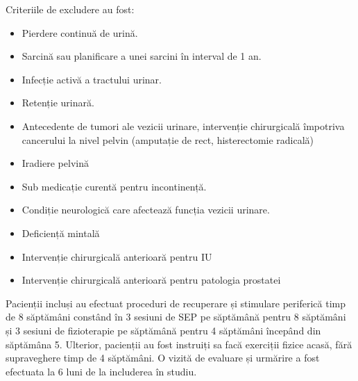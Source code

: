 \documentclass[12pt,draft]{article}
\begin{document}
 Criteriile de excludere au fost:
  \begin{itemize}
    \item Pierdere continuă de urină.
    \item Sarcină sau planificare a unei sarcini în interval de 1 an.
    \item Infecție activă a tractului urinar.
    \item Retenție urinară.
    \item Antecedente de tumori ale vezicii urinare, intervenție chirurgicală împotriva cancerului la nivel pelvin (amputație de rect, histerectomie radicală)
    \item Iradiere pelvină
    \item Sub medicație curentă pentru incontinență.
    \item Condiție neurologică care afectează funcția vezicii urinare.
    \item Deficiență mintală 
    \item Intervenție chirurgicală anterioară pentru IU
    \item Intervenție chirurgicală anterioară pentru patologia prostatei 
   \end{itemize}
  Pacienții incluși au efectuat proceduri de recuperare și stimulare periferică timp de 8 săptămâni constând în 3 sesiuni de \ac{SEP} pe săptămână pentru 8 săptămâni și 3 sesiuni de fizioterapie pe săptămână pentru 4 săptămâni începând din săptămâna 5. Ulterior, pacienții au fost instruiți sa facă exerciții fizice acasă, fără supraveghere timp de 4 săptămâni. O vizită de evaluare și urmărire a fost efectuata la 6 luni de la includerea în studiu.
  
\end{document}
